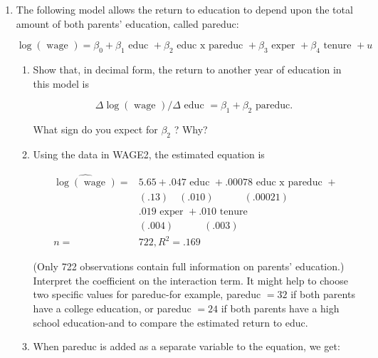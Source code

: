 \documentclass[12pt]{article}
\begin{document}
\begin{enumerate}
{\begin{enumerate}
\[
\widehat{\text{rdintens}} = 2.613 + 0.30 \times \text{salesbil} - 0.007 \times \text{salesbil}^2,
\]
with standard errors:
\[
(0.429) \quad (0.14) \quad (0.0037).
\]

The \( R^2 \) remains unchanged at 0.1484.

\item The transformed equation using \( \text{salesbil} \) is preferred because the coefficients are more interpretable. The coefficient on \( \text{salesbil} \) represents the effect of a one billion dollar increase in sales, which is a more meaningful unit in the context of large corporations. Additionally, the coefficients are easier to read and interpret when dealing with billions rather than millions.

\end{enumerate}
}


\item The following model allows the return to education to depend upon the total amount of both parents' education, called pareduc:

$$
\log (\text { wage })=\beta_0+\beta_1 \text { educ }+\beta_2 \text { educ x pareduc }+\beta_3 \text { exper }+\beta_4 \text { tenure }+u
$$
\begin{enumerate}
    \item  Show that, in decimal form, the return to another year of education in this model is

$$
\Delta \log (\text { wage }) / \Delta \text { educ }=\beta_1+\beta_2 \text { pareduc. }
$$


What sign do you expect for $\beta_2$ ? Why?
\item Using the data in WAGE2, the estimated equation is

$$
\begin{aligned}
\widehat{\log (\text { wage })}= & 5.65+.047 \text { educ }+.00078 \text { educ x pareduc }+ \\
& (.13)\quad(.010) \quad\quad\quad(.00021) \\
& .019 \text { exper }+.010 \text { tenure } \\
& (.004) \quad\quad\quad(.003) \\
n= & 722, R^2=.169
\end{aligned}
$$

(Only 722 observations contain full information on parents' education.) Interpret the coefficient on the interaction term. It might help to choose two specific values for pareduc-for example, pareduc $=32$ if both parents have a college education, or pareduc $=24$ if both parents have a high school education-and to compare the estimated return to educ.
\item When pareduc is added as a separate variable to the equation, we get:


\end{enumerate}
\end{enumerate}
\end{document}
